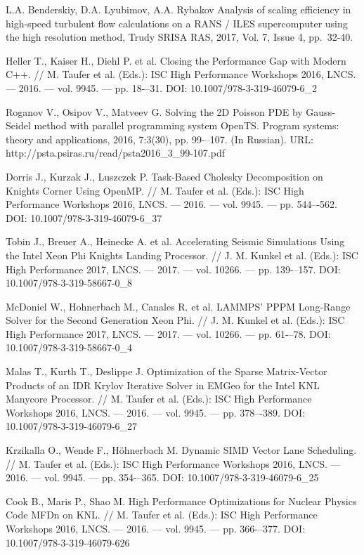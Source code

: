 \documentclass[
11pt,%
tightenlines,%
twoside,%
onecolumn,%
nofloats,%
nobibnotes,%
nofootinbib,%
superscriptaddress,%
noshowpacs,%
centertags]%
{revtex4}
\begin{document}
\begin{thebibliography}{99}
L.A. Benderskiy, D.A. Lyubimov, A.A. Rybakov Analysis of scaling efficiency in high-speed turbulent flow calculations on a RANS / ILES supercomputer using the high resolution method, Trudy SRISA RAS, 2017, Vol. 7, Issue 4, pp.~32-40.

Heller T., Kaiser H., Diehl P. et al. Closing the Performance Gap with Modern C++. // M. Taufer et al. (Eds.): ISC High Performance Workshops 2016, LNCS. — 2016. — vol. 9945. — pp. 18-–31. DOI: 10.1007/978-3-319-46079-6\_2

Roganov V., Osipov V., Matveev G. Solving the
2D Poisson PDE by Gauss-Seidel method with parallel programming system
OpenTS. Program systems: theory and applications, 2016, 7:3(30), pp. 99-–107.
(In Russian). URL: http://psta.psiras.ru/read/psta2016\_3\_99-107.pdf

Dorris J., Kurzak J., Luszczek P. Task-Based Cholesky Decomposition on Knights Corner Using OpenMP. // M. Taufer et al. (Eds.): ISC High Performance Workshops 2016, LNCS. — 2016. — vol. 9945. — pp. 544–-562. DOI: 10.1007/978-3-319-46079-6\_37

Tobin J., Breuer A., Heinecke A. et al. Accelerating Seismic Simulations Using the Intel Xeon Phi Knights Landing Processor. // J. M. Kunkel et al. (Eds.): ISC High Performance 2017, LNCS. — 2017. — vol. 10266. — pp. 139-–157. DOI: 10.1007/978-3-319-58667-0\_8

McDoniel W., Hohnerbach M., Canales R. et al. LAMMPS' PPPM Long-Range Solver for the Second Generation Xeon Phi. // J. M. Kunkel et al. (Eds.): ISC High Performance 2017, LNCS. — 2017. — vol. 10266. — pp. 61-–78. DOI: 10.1007/978-3-319-58667-0\_4

Malas T., Kurth T., Deslippe J. Optimization of the Sparse Matrix-Vector Products of an IDR Krylov Iterative Solver in EMGeo for the Intel KNL Manycore Processor. // M. Taufer et al. (Eds.): ISC High Performance Workshops 2016, LNCS. — 2016. — vol. 9945. — pp. 378–-389. DOI: 10.1007/978-3-319-46079-6\_27

Krzikalla O., Wende F., H\"ohnerbach M. Dynamic SIMD Vector Lane Scheduling. // M. Taufer et al. (Eds.): ISC High Performance Workshops 2016, LNCS. — 2016. — vol. 9945. — pp. 354-–365. DOI: 10.1007/978-3-319-46079-6\_25

Cook B., Maris P., Shao M. High Performance Optimizations for Nuclear Physics Code MFDn on KNL. // M. Taufer et al. (Eds.): ISC High Performance Workshops 2016, LNCS. — 2016. — vol. 9945. — pp. 366-–377. DOI: 10.1007/978-3-319-46079-626


\end{thebibliography}
\end{document}
